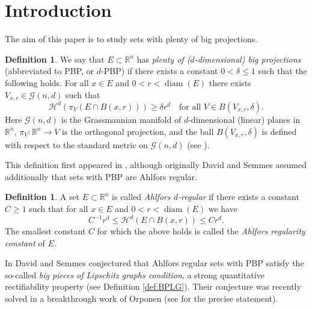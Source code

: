 \documentclass[11pt,reqno]{amsart}
\def\dG{{\mathcal{G}}}
\DeclareMathOperator{\diam}{diam}
\theoremstyle{definition}
\newtheorem{definition}[theorem]{Definition}
\theoremstyle{remark}
\numberwithin{equation}{section}
\newcommand{\R}{\mathbb{R}}
\newcommand{\hd}{\mathcal{H}^d}
\newcommand{\dH}{\mathcal{H}}
\theoremstyle{theorem}
\theoremstyle{definition}
\theoremstyle{remark}
\numberwithin{equation}{section}
\begin{document}
	\section{Introduction}
	The aim of this paper is to study sets with plenty of big projections.
	\begin{definition}
		We say that $E\subset\R^n$ has \emph{plenty of ($d$-dimensional) big projections} (abbreviated to PBP, or $d$-PBP) if there exists a constant $0<\delta\le 1$ such that the following holds. For all $x\in E$ and $0<r<\diam(E)$ there exists $V_{x,r}\in \dG(n,d)$ such that
		\begin{equation*}
		\hd(\pi_V(E\cap B(x,r)))\ge \delta r^d\quad\text{for all }V\in B(V_{x,r},\delta).
		\end{equation*}
	Here $\dG(n,d)$ is the Grassmannian manifold of $d$-dimensional (linear) planes in $\R^n$, $\pi_V:\R^n \to V$ is the orthogonal projection, and the ball $B(V_{x,r}, \delta)$ is defined with respect to the standard metric on $\dG(n,d)$ (see ). 
	\end{definition}
	This definition first appeared in \cite{david1993quantitative}, although originally David and Semmes assumed additionally that sets with PBP are Ahlfors regular.
	\begin{definition}
		A set $E \subset \R^n$ is called \emph{Ahlfors $d$-regular} if there exists a constant $C \geq 1$ such that for all $x\in E$ and $0<r<\diam(E)$ we have
		\begin{equation*}
		C^{-1} r^d \leq \dH^d(E\cap B(x,r)) \leq C r^d.
		\end{equation*}
		The smallest constant $C$ for which the above holds is called the \emph{Ahlfors regularity constant} of $E$.
	\end{definition}
	In \cite{david1993quantitative} David and Semmes conjectured that Ahlfors regular sets with PBP satisfy the so-called \emph{big pieces of Lipschitz graphs condition}, a strong quantitative rectifiability property (see Definition \ref{def:BPLG}). Their conjecture was recently solved in a breakthrough work of Orponen \cite{orponen2020plenty} (see  for the precise statement).
 
\end{document}

